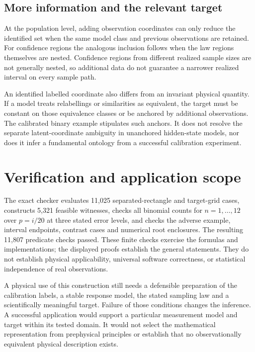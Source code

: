 \documentclass[11pt]{article}
\begin{document}
\subsection{More information and the relevant target}

At the population level, adding observation coordinates can only reduce the identified set when the same model class and previous observations are retained. For confidence regions the analogous inclusion follows when the law regions themselves are nested. Confidence regions from different realized sample sizes are not generally nested, so additional data do not guarantee a narrower realized interval on every sample path.

An identified labelled coordinate also differs from an invariant physical quantity. If a model treats relabellings or similarities as equivalent, the target must be constant on those equivalence classes or be anchored by additional observations. The calibrated binary example stipulates such anchors. It does not resolve the separate latent-coordinate ambiguity in unanchored hidden-state models, nor does it infer a fundamental ontology from a successful calibration experiment.

\section{Verification and application scope}

The exact checker evaluates 11,025 separated-rectangle and target-grid cases, constructs 5,321 feasible witnesses, checks all binomial counts for $n=1,\ldots,12$ over $p=i/20$ at three stated error levels, and checks the adverse example, interval endpoints, contrast cases and numerical root enclosures. The resulting 11,807 predicate checks passed. These finite checks exercise the formulas and implementations; the displayed proofs establish the general statements. They do not establish physical applicability, universal software correctness, or statistical independence of real observations.

A physical use of this construction still needs a defensible preparation of the calibration labels, a stable response model, the stated sampling law and a scientifically meaningful target. Failure of those conditions changes the inference. A successful application would support a particular measurement model and target within its tested domain. It would not select the mathematical representation from prephysical principles or establish that no observationally equivalent physical description exists.
\end{document}
